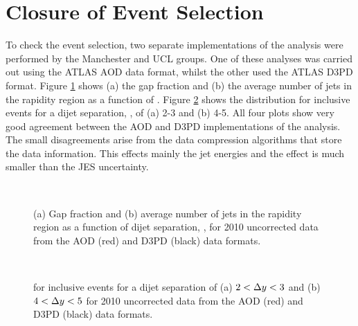 \section{Closure of Event Selection}
\label{sec:GBJ2:AODD3PD}

To check the event selection, two separate implementations of the analysis were performed by the Manchester and UCL groups.
One of these analyses was carried out using the ATLAS AOD data format, whilst the other used the ATLAS D3PD format.
Figure \ref{GBJ2:AODD3PD:gap_njet} shows (a) the  gap fraction and (b) the  average number of jets in the rapidity region as a function of \dy{}.
Figure \ref{GBJ2:AODD3PD:dphi} shows the \dphi{} distribution for inclusive events for a dijet separation, \dy{}, of (a) 2-3 and (b) 4-5. 
All four plots show very good agreement between the AOD and D3PD implementations of the analysis.
The small disagreements arise from the data compression algorithms that store the data information.
This effects mainly the jet energies and the effect is much smaller than the JES uncertainty.


\begin{figure}
\centering
\mbox{
              \quad
              \quad
                              }
\caption[Comparison of gap fraction and mean number of jets between AOD data format and D3PD data format]{
(a) Gap fraction and (b) average number of jets in the rapidity region as a function of dijet separation, \dy{}, for 2010 uncorrected data from the AOD (red) and D3PD (black) data formats.
\label{GBJ2:AODD3PD:gap_njet}}
\end{figure}


\begin{figure}
\centering
\mbox{
              \quad
              \quad
                              }
\caption[Comparison of \dphiDist{} between AOD data format and D3PD data format]{
\dphiDist{} for inclusive events for a dijet separation of (a) $2<\mbox{$\Delta y$}{}<3$ and (b) $4<\mbox{$\Delta y$}{}<5$ for 2010 uncorrected data from the AOD (red) and D3PD (black) data formats.
\label{GBJ2:AODD3PD:dphi}}
\end{figure}

